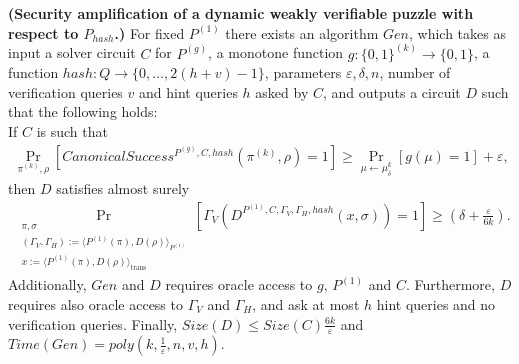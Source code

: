 \begin{lemma}\textbf{(Security amplification of a dynamic weakly verifiable puzzle with respect to $P_{hash}$.)}
  \label{lemma:sec_amp_for_p_hash}
  For fixed $P^{(1)}$ there exists an algorithm $Gen$,
  which takes as input a solver circuit $C$ for $P^{(g)}$, a monotone function $g:\{0,1\}^{(k)} \rightarrow \{0,1\}$,
  a function $hash : Q \rightarrow \{0, \dots, 2(h+v)-1\}$, parameters $\varepsilon, \delta, n$,
  number of verification queries $v$ and hint queries $h$ asked by $C$, and outputs a circuit $D$
  such that the following holds: \\
  If $C$ is such that \\
  \begin{align*}
    \underset{\pi^{(k)}, \rho}{\Pr}\left[CanonicalSuccess^{P^{(g)}, C, hash}(\pi^{(k)}, \rho)=1\right] \geq \underset{\mu \leftarrow \mu_\delta^k}{\Pr}[g(\mu) = 1] + \varepsilon,
  \end{align*}
  then $D$ satisfies almost surely
  \begin{align*}
    \underset{\substack{\pi, \sigma \\ (\Gamma_V,\Gamma_H) := \langle P^{(1)}(\pi), D(\rho) \rangle_{P^{(1)}} \\ x := \langle P^{(1)}(\pi), D(\rho) \rangle_{\text{trans}}}}
    {\Pr}\left[\Gamma_V(D^{P^{(1)},C,\Gamma_V, \Gamma_H, hash}(x, \sigma)) = 1\right] \geq (\delta + \frac{\varepsilon}{6k}).
  \end{align*}
  Additionally, $Gen$ and $D$ requires oracle access to $g$, $P^{(1)}$ and $C$.
  Furthermore, $D$ requires also oracle access to $\Gamma_V$ and $\Gamma_H$,
  and ask at most $h$ hint queries and no verification queries.
  Finally, $Size(D) \leq Size(C)\frac{6k}{\varepsilon}$ and $Time(Gen) = poly(k, \frac{1}{\varepsilon}, n, v, h)$.
\end{lemma}
%
